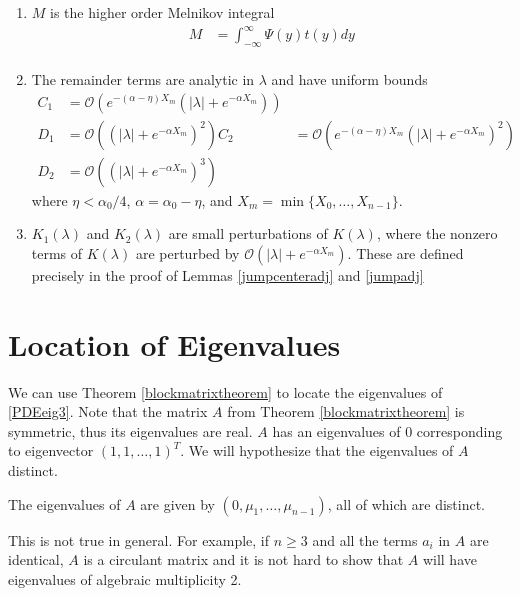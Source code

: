 \documentclass[thesis.tex]{subfiles}
\begin{document}
\begin{theorem}
\begin{enumerate}
\item $M$ is the higher order Melnikov integral
\begin{align*}
M &= \int_{-\infty}^\infty \Psi(y) t(y) dy \\
\end{align*}

\item The remainder terms are analytic in $\lambda$ and have uniform bounds
\begin{align*}
C_1 &= \mathcal{O}(e^{-(\alpha - \eta) X_m}(|\lambda| + e^{-\alpha X_m})) \\
D_1 &= \mathcal{O}((|\lambda| + e^{-\alpha X_m})^2)
C_2 &= \mathcal{O}(e^{-(\alpha - \eta) X_m}(|\lambda| + e^{-\alpha X_m})^2) \\
D_2 &= \mathcal{O}((|\lambda| + e^{-\alpha X_m})^3)
\end{align*}
where $\eta < \alpha_0/4$, $\alpha = \alpha_0 - \eta$, and $X_m = \min\{X_0, \dots, X_{n-1}\}$.

\item $K_1(\lambda)$ and $K_2(\lambda)$ are small perturbations of $K(\lambda)$, where the nonzero terms of $K(\lambda)$ are perturbed by $\mathcal{O}(|\lambda| + e^{-\alpha X_m})$. These are defined precisely in the proof of Lemmas \ref{jumpcenteradj} and \ref{jumpadj}

\end{enumerate}
\end{theorem}

\section{Location of Eigenvalues}

We can use Theorem \ref{blockmatrixtheorem} to locate the eigenvalues of \eqref{PDEeig3}. Note that the matrix $A$ from Theorem \ref{blockmatrixtheorem} is symmetric, thus its eigenvalues are real. $A$ has an eigenvalues of 0 corresponding to eigenvector $(1, 1, \dots, 1)^T$. We will hypothesize that the eigenvalues of $A$ distinct. 

\begin{hypothesis}\label{Adistincteigs}
The eigenvalues of $A$ are given by $(0, \mu_1, \dots, \mu_{n-1})$, all of which are distinct.
\end{hypothesis}

This is not true in general. For example, if $n \geq 3$ and all the terms $a_i$ in $A$ are identical, $A$ is a circulant matrix and it is not hard to show that $A$ will have eigenvalues of algebraic multiplicity 2.
\end{document}

